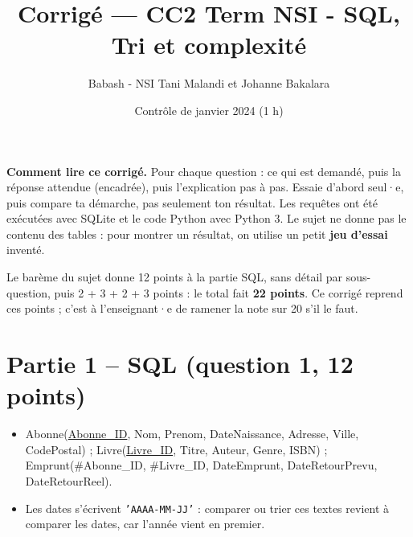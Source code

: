 \documentclass[11pt, a4paper]{exam}
\title{Corrigé — CC2 Term NSI - SQL, Tri et complexité}
\author{Babash - NSI Tani Malandi et Johanne Bakalara}
\date{Contrôle de janvier 2024 (1 h)}
\newcommand{\code}[1]{\texttt{#1}}
\begin{document}
\pagestyle{headandfoot}
\firstpageheader{}{}{}
\runningheadrule
{}

\maketitle
\thispagestyle{headandfoot}

\begin{tcolorbox}[colback=white, colframe=black, boxrule=0.5pt, arc=1mm, left=2mm, right=2mm]
\small\textbf{Comment lire ce corrigé.} Pour chaque question : ce qui est demandé, puis la réponse attendue (encadrée), puis l'explication pas à pas. Essaie d'abord seul·e, puis compare ta démarche, pas seulement ton résultat.
Les requêtes ont été exécutées avec SQLite et le code Python avec Python 3. Le sujet ne donne pas le contenu des tables : pour montrer un résultat, on utilise un petit \textbf{jeu d'essai} inventé.
\end{tcolorbox}

\begin{remarque}
Le barème du sujet donne 12 points à la partie SQL, sans détail par sous-question, puis 2 + 3 + 2 + 3 points : le total fait \textbf{22 points}. Ce corrigé reprend ces points ; c'est à l'enseignant·e de ramener la note sur 20 s'il le faut.
\end{remarque}

\section*{Partie 1 -- SQL (question 1, 12 points)}

\begin{retenir}
\begin{itemize}
\item Abonne(\underline{Abonne\_ID}, Nom, Prenom, DateNaissance, Adresse, Ville, CodePostal) ; Livre(\underline{Livre\_ID}, Titre, Auteur, Genre, ISBN) ; Emprunt(\#Abonne\_ID, \#Livre\_ID, DateEmprunt, DateRetourPrevu, DateRetourReel).
\item Les dates s'écrivent \code{'AAAA-MM-JJ'} : comparer ou trier ces textes revient à comparer les dates, car l'année vient en premier.
\end{itemize}
\end{retenir}
\end{document}
